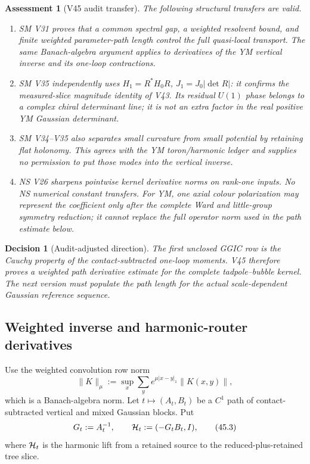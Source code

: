 \documentclass[11pt,oneside]{book}
\newtheorem{assessment}[theorem]{Assessment}
\newtheorem{decision}[theorem]{Decision}
\theoremstyle{definition}
\theoremstyle{remark}
\begin{document}
\begin{assessment}[V45 audit transfer]
\label{ass:e8v45-audit}
The following structural transfers are valid.
\begin{enumerate}
\item SM V31 proves that a common spectral gap, a weighted resolvent
      bound, and finite weighted parameter-path length control the
      full quasi-local transport.  The same Banach-algebra argument
      applies to derivatives of the YM vertical inverse and its
      one-loop contractions.
\item SM V35 independently uses
      \(H_1=R^*H_0R\), \(J_1=J_0|\det R|\): it confirms the
      measured-slice magnitude identity of V43.  Its residual
      \(U(1)\) phase belongs to a complex chiral determinant line;
      it is not an extra factor in the real positive YM Gaussian
      determinant.
\item SM V34--V35 also separates small curvature from small
      potential by retaining flat holonomy.  This agrees with the YM
      toron/harmonic ledger and supplies no permission to put those
      modes into the vertical inverse.
\item NS V26 sharpens pointwise kernel derivative norms on rank-one
      inputs.  No NS numerical constant transfers.  For YM, one
      axial colour polarization may represent the coefficient only
      after the complete Ward and little-group symmetry reduction;
      it cannot replace the full operator norm used in the path
      estimate below.
\end{enumerate}
\end{assessment}

\begin{decision}[Audit-adjusted direction]
\label{dec:e8v45-direction}
The first unclosed GGIC row is the Cauchy property of the
contact-subtracted one-loop moments.  V45 therefore proves a weighted
path derivative estimate for the complete tadpole--bubble kernel.
The next version must populate the path length for the actual
scale-dependent Gaussian reference sequence.
\end{decision}

\subsection{Weighted inverse and harmonic-router derivatives}

Use the weighted convolution row norm
\[
 \|K\|_\mu:=\sup_x\sum_y e^{\mu|x-y|_1}\|K(x,y)\|,              \tag{45.2}
\]
which is a Banach-algebra norm.  Let \(t\mapsto(A_t,B_t)\) be a
\(C^1\) path of contact-subtracted vertical and mixed Gaussian
blocks.  Put
\[
 G_t:=A_t^{-1},\qquad
 {\cal H}_t:=(-G_tB_t,I),                                      \tag{45.3}
\]
where \({\cal H}_t\) is the harmonic lift from a retained source to
the reduced-plus-retained tree slice.
\end{document}
